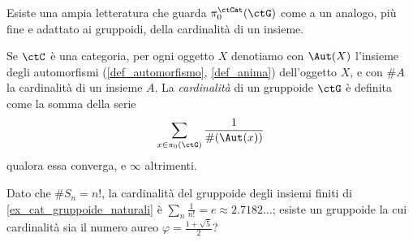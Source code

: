 Esiste una ampia letteratura che guarda \(\pi_0^\ctCat(\ctG)\) come a un analogo, più fine e adattato ai gruppoidi, della cardinalità di un insieme.
\begin{definition}
	Se \(\ctC\) è una categoria, per ogni oggetto \(X\) denotiamo con \(\Aut(X)\) l'insieme degli automorfismi (\ref{def_automorfismo}, \ref{def_anima}) dell'oggetto \(X\), e con \(\# A\) la cardinalità di un insieme \(A\). La \emph{cardinalità} di un gruppoide \(\ctG\) è definita come la somma della serie
	\[\sum_{x\in \pi_0(\ctG)} \frac 1{\#(\Aut(x))}\]
	qualora essa converga, e \(\infty\) altrimenti.
\end{definition}
Dato che \(\# S_n = n!\), la cardinalità del gruppoide degli insiemi finiti di \ref{ex_cat_gruppoide_naturali} è \(\sum_n \frac 1{n!} = e \approx 2.7182\dots\); esiste un gruppoide la cui cardinalità sia il numero aureo \(\varphi = \frac{1+\sqrt 5}{2}\)?

